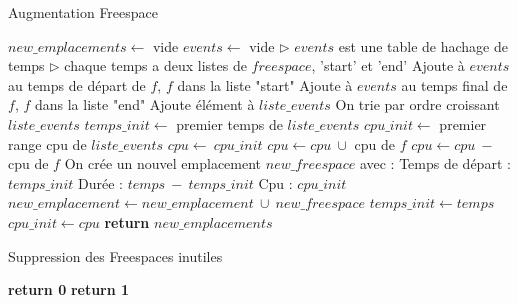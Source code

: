 \documentclass{report}
\begin{document}
\begin{algorithm}
\caption{Augmentation Freespace}\label{extend_freespace}
\begin{algorithmic}[1]
	\State $new\_emplacements \gets$ vide
	\State $events \gets$ vide
	\State
	\State \(\triangleright\) $events$ est une table de hachage de temps
	\State \(\triangleright\) chaque temps a deux listes de $freespace$, 'start' et 'end'
	\State
		\State Ajoute à $events$ au temps de départ de $f$, $f$ dans la liste "start"
		\State Ajoute à $events$ au temps final de $f$, $f$ dans la liste "end"
	\EndFor
	\State
		\State Ajoute élément à $liste\_events$	
	\EndFor
	\State
	\State On trie par ordre croissant $liste\_events$
	\State $temps\_init \gets$ premier temps de $liste\_events$
	\State $cpu\_init \gets$ premier range cpu de $liste\_events$
	\State
		\State $cpu \gets\ cpu\_init$
		\State
			\State $cpu \gets cpu\ \cup$ cpu de $f$
		\EndFor
		\State
			\State $cpu \gets cpu\ -$ cpu de $f$
		\EndFor
		\State
					\State On crée un nouvel emplacement $new\_freespace$ avec :
				\State \hspace{\algorithmicindent} Temps de départ : $temps\_init$
				\State \hspace{\algorithmicindent} Durée : $temps\ -\ temps\_init$
				\State \hspace{\algorithmicindent} Cpu : $cpu\_init$
			\State $new\_emplacement \gets new\_emplacement\ \cup\ new\_freespace$ 
			\State $temps\_init \gets temps$
		\EndIf
		\State $cpu\_init \gets cpu$
	\EndFor
	\State
	\State \textbf{return} $new\_emplacements$
\EndFunction
\end{algorithmic}
\end{algorithm}

\begin{algorithm}
\caption{Suppression des Freespaces inutiles}\label{is_necessary_freespace}
\begin{algorithmic}[1]
	\State
					\State \textbf{return 0}
				\EndIf
			\EndIf
		\EndIf
	\EndFor
	\State \textbf{return 1}
\EndFunction
\end{algorithmic}
\end{algorithm}
\end{document}

